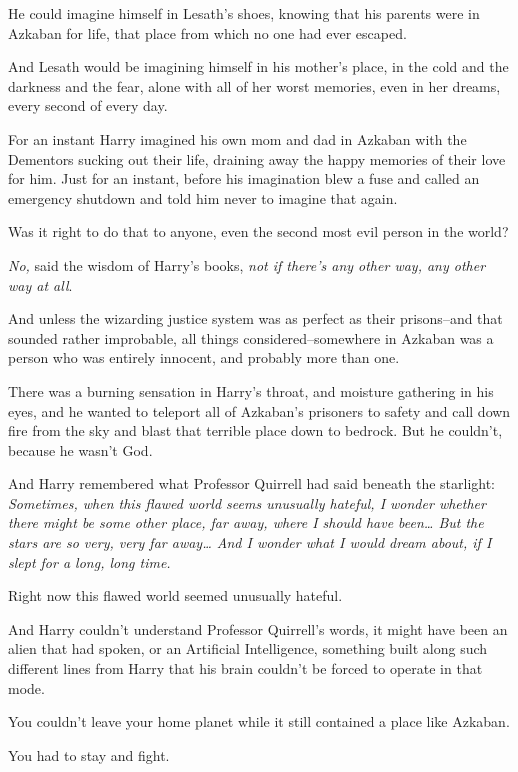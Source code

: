 He could imagine himself in Lesath's shoes, knowing that his parents were in Azkaban for life, that place from which no one had ever escaped.

And Lesath would be imagining himself in his mother's place, in the cold and the darkness and the fear, alone with all of her worst memories, even in her dreams, every second of every day.

For an instant Harry imagined his own mom and dad in Azkaban with the Dementors sucking out their life, draining away the happy memories of their love for him. Just for an instant, before his imagination blew a fuse and called an emergency shutdown and told him never to imagine that again.

Was it right to do that to anyone, even the second most evil person in the world?

\emph{No,} said the wisdom of Harry's books, \emph{not if there's any other way, any other way at all}.

And unless the wizarding justice system was as perfect as their prisons\---and that sounded rather improbable, all things considered\---somewhere in Azkaban was a person who was entirely innocent, and probably more than one.

There was a burning sensation in Harry's throat, and moisture gathering in his eyes, and he wanted to teleport all of Azkaban's prisoners to safety and call down fire from the sky and blast that terrible place down to bedrock. But he couldn't, because he wasn't God.

And Harry remembered what Professor Quirrell had said beneath the starlight: \emph{Sometimes, when this flawed world seems unusually hateful, I wonder whether there might be some other place, far away, where I should have been{\ldots} But the stars are so very, very far away{\ldots} And I wonder what I would dream about, if I slept for a long, long time.}

Right now this flawed world seemed unusually hateful.

And Harry couldn't understand Professor Quirrell's words, it might have been an alien that had spoken, or an Artificial Intelligence, something built along such different lines from Harry that his brain couldn't be forced to operate in that mode.

You couldn't leave your home planet while it still contained a place like Azkaban.

You had to stay and fight.

